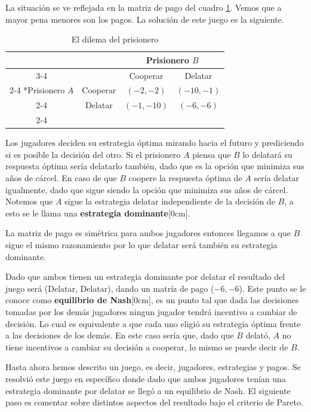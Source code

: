 La situación se ve reflejada en la matriz de pago del cuadro \ref{Juego: Prisionero}. Vemos que a mayor pena menores son los pagos. La solución de este juego es la siguiente.

\begin{table}[!htbp]
    \centering
    \caption{El dilema del prisionero}
    \setlength{\extrarowheight}{2pt}
    \begin{tabular}{*{4}{c|}}
      \multicolumn{2}{c}{} & \multicolumn{2}{c}{Prisionero $B$}\\\cline{3-4}
      \multicolumn{1}{c}{} &  & Cooperar  & Delatar \\\cline{2-4}
      \multirow{2}*{Prisionero $A$}  & Cooperar & $(-2,-2)$ & $(-10,-1)$ \\\cline{2-4}
      & Delatar & $(-1,-10)$ & $(-6,-6)$ \\\cline{2-4}
    \end{tabular} \label{Juego: Prisionero}
  \end{table}

Los jugadores deciden su estrategia óptima mirando hacia el futuro y prediciendo si es posible la decisión del otro. Si el prisionero $A$ piensa que $B$ lo delatará su respuesta óptima sería delatarlo también, dado que es la opción que minimiza sus años de cárcel. En caso de que $B$ coopere la respuesta óptima de $A$ sería delatar igualmente, dado que sigue siendo la opción que minimiza sus años de cárcel. Notemos que $A$ sigue la estrategia delatar independiente de la decisión de $B$, a esto se le llama una \textbf{estrategia dominante}[0cm].

La matriz de pago es simétrica para ambos jugadores entonces llegamos a que $B$ sigue el mismo razonamiento por lo que delatar será también su estrategia dominante.

Dado que ambos tienen un estrategia dominante por delatar el resultado del juego será (Delatar, Delatar), dando un matríz de pago ($-6,-6$). Este punto se le conoce como \textbf{equilibrio de Nash}[0cm], es un punto tal que dada las decisiones tomadas por los demás jugadores ningun jugador tendrá incentivo a cambiar de decisión. Lo cual es equivalente a que cada uno eligió su estrategia óptima frente a las decisiones de los demás. En este caso sería que, dado que $B$ delató, $A$ no tiene incentivos a cambiar su decisión a cooperar, lo mismo se puede decir de $B$.

Hasta ahora hemos descrito un juego, es decir, jugadores, estrategias y pagos. Se resolvió este juego en específico donde dado que ambos jugadores tenían una estrategia dominante por delatar se llegó a un equilibrio de Nash. El siguiente paso es comentar sobre distintos aspectos del resultado bajo el criterio de Pareto.

